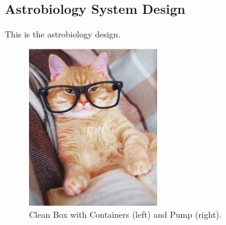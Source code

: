 \subsection{Astrobiology System Design}
\label{sec:Astrobiology-Design}

This is the astrobiology design.

\begin{figure}[H]
	\begin{center}
		\includegraphics[width=0.5\textwidth]{figures/sample.png}
		\caption{Clean Box with Containers (left) and Pump (right).}
		\label{fig:Astrobio System}
	\end{center}
\end{figure}

